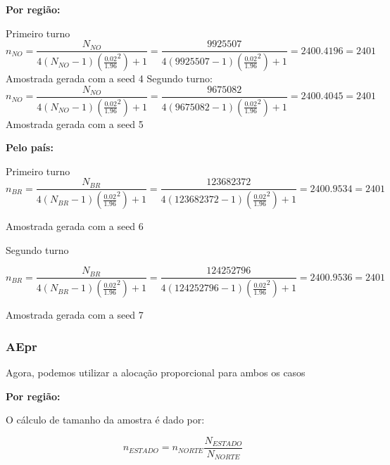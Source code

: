 \documentclass{article}
\begin{document}
\textbf{Por região:}

Primeiro turno
\[
n_{NO} = \frac{N_{NO}}{4(N_{NO}-1)(\frac{0.02}{1.96}^2) + 1 } = \frac{9925507}{4(9925507 - 1) (\frac{0.02}{1.96}^2) + 1} = 2400.4196 = 2401
\]
Amostrada gerada com a seed 4
Segundo turno:
\[
n_{NO} = \frac{N_{NO}}{4(N_{NO}-1)(\frac{0.02}{1.96}^2) + 1 } = \frac{9675082}{4(9675082 - 1) (\frac{0.02}{1.96}^2) + 1} = 2400.4045 = 2401
\]
Amostrada gerada com a seed 5

\textbf{Pelo país:}

Primeiro turno
\[
n_{BR} = \frac{N_{BR}}{4(N_{BR}-1)(\frac{0.02}{1.96}^2) + 1 } = \frac{123682372}{4(123682372 - 1) (\frac{0.02}{1.96}^2) + 1} = 2400.9534 = 2401
\]

Amostrada gerada com a seed 6

Segundo turno

\[
n_{BR} = \frac{N_{BR}}{4(N_{BR}-1)(\frac{0.02}{1.96}^2) + 1 } = \frac{124252796}{4(124252796 - 1) (\frac{0.02}{1.96}^2) + 1} = 2400.9536 = 2401
\]

Amostrada gerada com a seed 7

\subsubsection*{AEpr}

Agora, podemos utilizar a alocação proporcional para ambos os casos

\textbf{Por região:}


O cálculo de tamanho da amostra é dado por:

\[
n_{ESTADO} = n_{NORTE}\frac{N_{ESTADO}}{N_{NORTE}}
\]


\begin{table}[H]
\centering
\caption{Tamanho da Amostra Estratificada (AEpr) -- Regi\~{a}o Norte}
\end{table}
\end{document}

